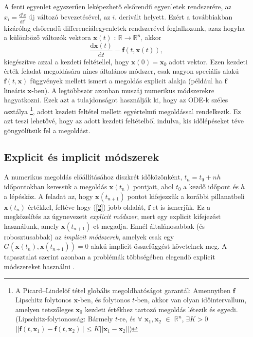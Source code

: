 \documentclass[12pt]{article}
\theoremstyle{plain}
\newcommand{\xvec}{\mathbf{x}}
\begin{document}
A fenti egyenlet egyszerűen leképezhető elsőrendű egyenletek rendszerére, az $x_i = \frac{\text{d}^ix}{\text{d}t^i}$ új változó bevezetésével, az $i$. derivált helyett. Ezért a továbbiakban kizárólag elsőrendű differenciálegyenletek rendszerével foglalkozunk, azaz hogyha a különböző változók vektora $\xvec(t)$ : $\mathbb{R} \to \mathbb{R}^n$, akkor
\begin{equation}
    \label{2}
    \frac{\text{d} \xvec(t)}{\text{d}t} = \mathbf{f}(t, \xvec(t)), 
\end{equation}
kiegészítve azzal a kezdeti feltétellel, hogy $\xvec(0) = \xvec_0$ adott vektor. Ezen kezdeti érték feladat megoldására nincs általános módszer, csak nagyon speciális alakú $\mathbf{f}(t, \xvec)$ függvények mellett ismert a megoldás explicit alakja (például ha $\mathbf{f}$ lineáris $\xvec$-ben). A legtöbbször azonban muszáj numerikus módszerekre hagyatkozni. Ezek azt a tulajdonságot használják ki, hogy az ODE-k széles osztálya \footnote{A Picard–Lindelöf tétel\cite{ode} globális megoldhatóságot garantál: Amennyiben $\mathbf{f}$ Lipschitz folytonos $\xvec$-ben, és folytonos $t$-ben, akkor van olyan időintervallum, amelyen tetszőleges $\xvec_0$ kezdeti értékhez tartozó megoldás létezik és egyedi. (Lipschitz-folytonosság: Bármely $t$-re, és $\forall$ $\xvec_1, \xvec_2$ $\in$ $\mathbb{R}^n$, $\exists K>0$ $||\mathbf{f}(t,\xvec_1) -\mathbf{f}(t, \xvec_2)||\leq K||\xvec_1 - \xvec_2||$)}, adott kezdeti feltétel mellett egyértelmű megoldással rendelkezik. Ez azt teszi lehetővé, hogy az adott kezdeti feltételből indulva, kis időlépéseket téve göngyölítsük fel a megoldást. 
\subsection{Explicit és implicit módszerek}
A numerikus megoldás előállításához diszkrét időközönként, $t_n = t_0 + nh$ időpontokban keressük a megoldás $\xvec(t_n)$ pontjait, ahol $t_0$ a kezdő időpont és $h$ a lépésköz. 
A feladat az, hogy $\xvec(t_{n+1})$ pontot kifejezzük a korábbi pillanatbeli $\xvec(t_n)$ értékkel, feltéve hogy (\ref{2}) jobb oldalát, $\mathbf{f}$-et is ismerjük. Ez a megközelítés az úgynevezett {\em explicit módszer}, mert egy explicit kifejezést használunk, amely $\xvec(t_{n+1})$-et megadja. Ennél általánosabbak (és robosztusabbak) az {\em implicit módszerek}, amelyek csak egy $G(\xvec(t_n), \xvec(t_{n+1}))=0$ alakú implicit összefüggést követelnek meg. A tapasztalat szerint azonban a problémák többségében elegendő explicit módszereket használni \cite{landau, tel}.
\end{document}
